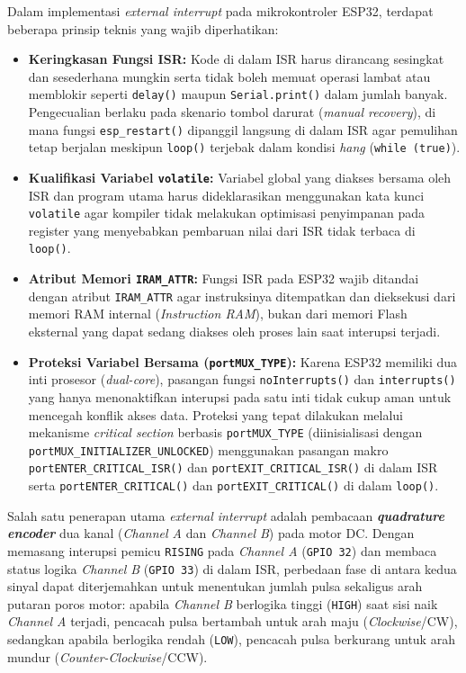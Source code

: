 Dalam implementasi \textit{external interrupt} pada mikrokontroler ESP32, terdapat beberapa prinsip teknis yang wajib diperhatikan:
\begin{itemize}
    \item \textbf{Keringkasan Fungsi ISR:} Kode di dalam ISR harus dirancang sesingkat dan sesederhana mungkin serta tidak boleh memuat operasi lambat atau memblokir seperti \texttt{delay()} maupun \texttt{Serial.print()} dalam jumlah banyak. Pengecualian berlaku pada skenario tombol darurat (\textit{manual recovery}), di mana fungsi \texttt{esp\_restart()} dipanggil langsung di dalam ISR agar pemulihan tetap berjalan meskipun \texttt{loop()} terjebak dalam kondisi \textit{hang} (\texttt{while (true)}).
    \item \textbf{Kualifikasi Variabel \texttt{volatile}:} Variabel global yang diakses bersama oleh ISR dan program utama harus dideklarasikan menggunakan kata kunci \texttt{volatile} agar kompiler tidak melakukan optimisasi penyimpanan pada register yang menyebabkan pembaruan nilai dari ISR tidak terbaca di \texttt{loop()}.
    \item \textbf{Atribut Memori \texttt{IRAM\_ATTR}:} Fungsi ISR pada ESP32 wajib ditandai dengan atribut \texttt{IRAM\_ATTR} agar instruksinya ditempatkan dan dieksekusi dari memori RAM internal (\textit{Instruction RAM}), bukan dari memori Flash eksternal yang dapat sedang diakses oleh proses lain saat interupsi terjadi.
    \item \textbf{Proteksi Variabel Bersama (\texttt{portMUX\_TYPE}):} Karena ESP32 memiliki dua inti prosesor (\textit{dual-core}), pasangan fungsi \texttt{noInterrupts()} dan \texttt{interrupts()} yang hanya menonaktifkan interupsi pada satu inti tidak cukup aman untuk mencegah konflik akses data. Proteksi yang tepat dilakukan melalui mekanisme \textit{critical section} berbasis \texttt{portMUX\_TYPE} (diinisialisasi dengan \texttt{portMUX\_INITIALIZER\_UNLOCKED}) menggunakan pasangan makro \texttt{portENTER\_CRITICAL\_ISR()} dan \texttt{portEXIT\_CRITICAL\_ISR()} di dalam ISR serta \texttt{portENTER\_CRITICAL()} dan \texttt{portEXIT\_CRITICAL()} di dalam \texttt{loop()}.
\end{itemize}

Salah satu penerapan utama \textit{external interrupt} adalah pembacaan \textbf{\textit{quadrature encoder}} dua kanal (\textit{Channel A} dan \textit{Channel B}) pada motor DC. Dengan memasang interupsi pemicu \texttt{RISING} pada \textit{Channel A} (\texttt{GPIO 32}) dan membaca status logika \textit{Channel B} (\texttt{GPIO 33}) di dalam ISR, perbedaan fase di antara kedua sinyal dapat diterjemahkan untuk menentukan jumlah pulsa sekaligus arah putaran poros motor: apabila \textit{Channel B} berlogika tinggi (\texttt{HIGH}) saat sisi naik \textit{Channel A} terjadi, pencacah pulsa bertambah untuk arah maju (\textit{Clockwise}/CW), sedangkan apabila berlogika rendah (\texttt{LOW}), pencacah pulsa berkurang untuk arah mundur (\textit{Counter-Clockwise}/CCW).

